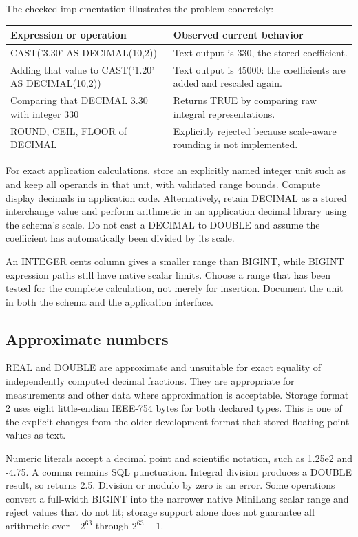 The checked implementation illustrates the problem concretely:

\begin{longtable}{p{.48\linewidth}p{.45\linewidth}}
\toprule
Expression or operation & Observed current behavior \\
\midrule
\endhead
CAST('3.30' AS DECIMAL(10,2)) & Text output is 330, the stored coefficient. \\
Adding that value to CAST('1.20' AS DECIMAL(10,2)) & Text output is 45000: the coefficients are added and rescaled again. \\
Comparing that DECIMAL 3.30 with integer 330 & Returns TRUE by comparing raw integral representations. \\
ROUND, CEIL, FLOOR of DECIMAL & Explicitly rejected because scale-aware rounding is not implemented. \\
\bottomrule
\end{longtable}

For exact application calculations, store an explicitly named integer unit such as  and keep all operands in that unit, with validated range bounds. Compute display decimals in application code. Alternatively, retain DECIMAL as a stored interchange value and perform arithmetic in an application decimal library using the schema's scale. Do not cast a DECIMAL to DOUBLE and assume the coefficient has automatically been divided by its scale.

An INTEGER cents column gives a smaller range than BIGINT, while BIGINT expression paths still have native scalar limits. Choose a range that has been tested for the complete calculation, not merely for insertion. Document the unit in both the schema and the application interface.

\subsection{Approximate numbers}

REAL and DOUBLE are approximate and unsuitable for exact equality of independently computed decimal fractions. They are appropriate for measurements and other data where approximation is acceptable. Storage format 2 uses eight little-endian IEEE-754 bytes for both declared types. This is one of the explicit changes from the older development format that stored floating-point values as text.

Numeric literals accept a decimal point and scientific notation, such as 1.25e2 and -4.75. A comma remains SQL punctuation. Integral division produces a DOUBLE result, so  returns 2.5. Division or modulo by zero is an error. Some operations convert a full-width BIGINT into the narrower native MiniLang scalar range and reject values that do not fit; storage support alone does not guarantee all arithmetic over \(-2^{63}\) through \(2^{63}-1\).

